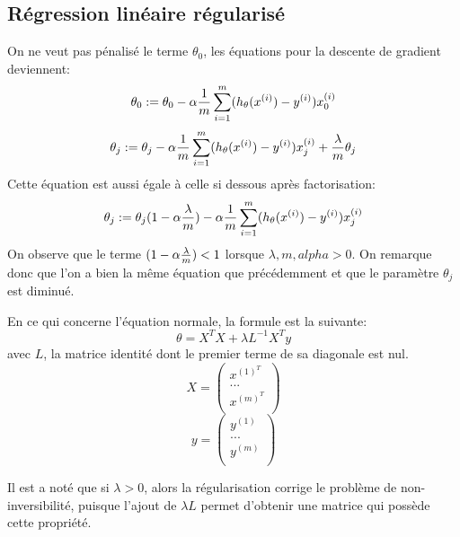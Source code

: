 \documentclass{article}
\theoremstyle{definition}
\begin{document}
\subsection{Régression linéaire régularisé}
On ne veut pas pénalisé le terme $\theta_0$, les équations pour la descente de gradient deviennent:
\begin{equation}
\theta_0 := \theta_0 - \alpha {1\over m} \sum_{i=1}^{m}(h_\theta(x^{(i)})-y^{(i)})x_0^{(i)}
\end{equation}
\begin{equation}
\theta_j := \theta_j - \alpha {1\over m} \sum_{i=1}^{m}(h_\theta(x^{(i)})-y^{(i)})x_j^{(i)} + {\lambda\over m} \theta_j
\end{equation}
Cette équation est aussi égale à celle si dessous après factorisation:
\begin{equation}
\theta_j := \theta_j(1-\alpha {\lambda\over m}) - \alpha {1\over m} \sum_{i=1}^{m}(h_\theta(x^{(i)})-y^{(i)})x_j^{(i)}
\end{equation}
On observe que le terme $(1-\alpha {\lambda\over m}) < 1$ lorsque $\lambda,m,alpha >0$.
On remarque donc que l'on a bien la même équation que précédemment et que le paramètre $\theta_j$ est diminué.\par
En ce qui concerne l'équation normale, la formule est la suivante:
\begin{equation}
\theta = X^{T}X+\lambda L^{-1}X^{T}y
\end{equation}
avec $L$, la matrice identité dont le premier terme de sa diagonale est nul.
\begin{equation}
X=
\begin{pmatrix}
x^{(1)^{T}} \\
... \\
x^{(m)^{T}} \\
\end{pmatrix}
\end{equation}
\begin{equation}
y=
\begin{pmatrix}
y^{(1)} \\
... \\
y^{(m)} \\
\end{pmatrix}
\end{equation}

Il est a noté que si $\lambda > 0$, alors la régularisation corrige le problème de non-inversibilité, puisque l'ajout de $\lambda L$ permet d'obtenir une matrice qui possède cette propriété.\par
\end{document}
